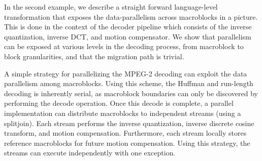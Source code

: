 In the second example, we describe a straight forward language-level
transformation that exposes the data-parallelism across macroblocks in
a picture. This is done in the context of the decoder pipeline which
consists of the inverse quantization, inverse DCT, and motion
compensator. We show that parallelism can be exposed at various levels
in the decoding process, from macroblock to block granularities, and
that the migration path is trivial.






A simple strategy for parallelizing the MPEG-2 decoding can exploit
the data parallelism among macroblocks. Using this scheme, the Huffman
and run-length decoding is inherently serial, as macroblock boundaries
can only be discovered by performing the decode operation.  Once this
decode is complete, a parallel implementation can distribute
macroblocks to independent streams (using a splitjoin). Each stream
performs the inverse quantization, inverse discrete cosine transform,
and motion compensation. Furthermore, each stream locally stores
reference macroblocks for future motion compensation. Using this
strategy, the streams can execute independently with one exception.

